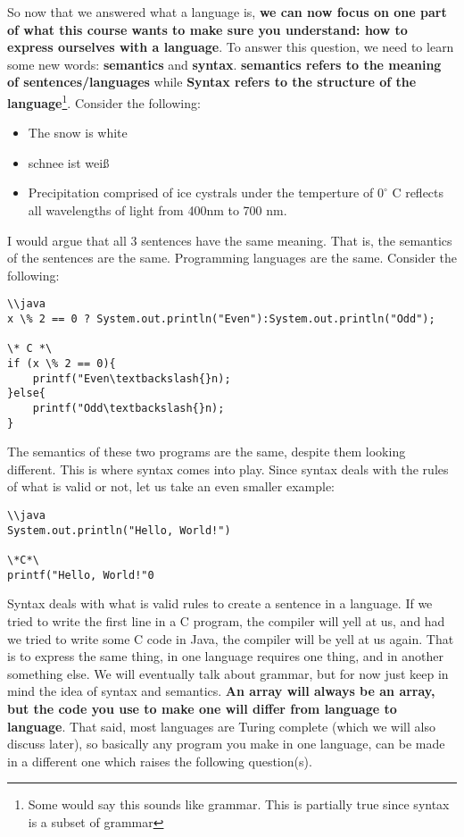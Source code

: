 \documentclass[main.tex]{subfiles}
\begin{document}
So now that we answered what a language is, \textbf{we can now focus on one part of what this course wants to make sure you understand: how to express ourselves with a language}. To answer this question, we need to learn some new words: \textbf{semantics} and \textbf{syntax}. \textbf{semantics refers to the meaning of sentences/languages} while  \textbf{Syntax refers to the structure of the language}\footnote{Some would say this sounds like grammar. This is partially true since syntax is a subset of grammar}. Consider the following:
\begin{center}
\begin{itemize}
    \item The snow is white\\
    \item schnee ist wei{\ss}\\
    \item Precipitation comprised of ice cystrals under the temperture of $0^{\circ}$ C reflects all wavelengths of light from 400nm to 700 nm.
\end{itemize}
\end{center}
I would argue that all 3 sentences have the same meaning. That is, the semantics of the sentences are the same. Programming languages are the same. Consider the following:
\begin{verbatim}
\\java
x \% 2 == 0 ? System.out.println("Even"):System.out.println("Odd");

\* C *\
if (x \% 2 == 0){
    printf("Even\textbackslash{}n);
}else{
    printf("Odd\textbackslash{}n);
}
\end{verbatim}
The semantics of these two programs are the same, despite them looking different. This is where syntax comes into play. Since syntax deals with the rules of what is valid or not, let us take an even smaller example:
\begin{verbatim}
\\java
System.out.println("Hello, World!")

\*C*\
printf("Hello, World!"0
\end{verbatim}
Syntax deals with what is valid rules to create a sentence in a language. If we tried to write the first line in a C program, the compiler will yell at us, and had we tried to write some C code in Java, the compiler will be yell at us again. That is to express the same thing, in one language requires one thing, and in another something else. We will eventually talk about grammar, but for now just keep in mind the idea of syntax and semantics. \textbf{An array will always be an array, but the code you use to make one will differ from language to language}. That said, most languages are Turing complete (which we will also discuss later), so basically any program you make in one language, can be made in a different one which raises the following question(s).
\end{document}
